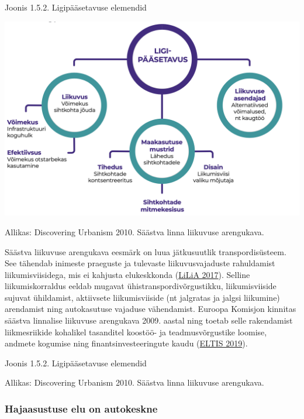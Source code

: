 \documentclass[estonian,]{article}
\begin{document}
{Joonis 1.5.2.} Ligipääsetavuse elemendid

\begin{center}\includegraphics[width=0.8\linewidth]{figures/1-chapter/fig152} \end{center}

\begin{imgsource}
{Allikas:} Discovering Urbanism 2010. Säästva linna liikuvuse
arengukava.
\end{imgsource}

\begin{casebox}
Säästva liikuvuse arengukava eesmärk on luua jätkusuutlik
transpordisüsteem. See tähendab inimeste praeguste ja tulevaste
liikuvusvajaduste rahuldamist liikumisviisidega, mis ei kahjusta
elukeskkonda (\protect\hyperlink{LiLiA2017}{LiLiA 2017}). Selline
liikumiskorraldus eeldab mugavat ühistranspordivõrgustikku,
liikumisviiside sujuvat ühildamist, aktiivsete liikumisviiside (nt
jalgratas ja jalgsi liikumine) arendamist ning autokasutuse vajaduse
vähendamist. Euroopa Komisjon kinnitas säästva linnalise liikuvuse
arengukava 2009. aastal ning toetab selle rakendamist liikmesriikide
kohalikel tasanditel koostöö- ja teadmusvõrgustike loomise, andmete
kogumise ning finantsinvesteeringute kaudu
(\protect\hyperlink{ELTIS2019}{ELTIS 2019}).

{Joonis 1.5.2.} Ligipääsetavuse elemendid
\end{casebox}
\begin{imgsource}
{Allikas:} Discovering Urbanism 2010. Säästva linna liikuvuse
arengukava.
\end{imgsource}

\hypertarget{hajaasustuse-elu-on-autokeskne}{%
\subsubsection*{Hajaasustuse elu on autokeskne}\label{hajaasustuse-elu-on-autokeskne}}
\end{document}
